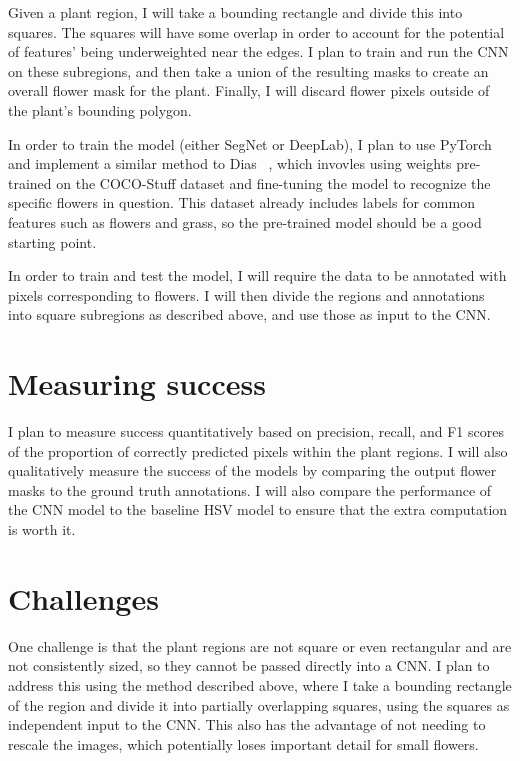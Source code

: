 \documentclass[10pt,twocolumn,letterpaper]{article}
\begin{document}
Given a plant region, I will take a bounding rectangle and divide this into squares. The squares will have some overlap in order to account for the potential of features' being underweighted near the edges. I plan to train and run the CNN on these subregions, and then take a union of the resulting masks to create an overall flower mask for the plant. Finally, I will discard flower pixels outside of the plant's bounding polygon.

In order to train the model (either SegNet or DeepLab), I plan to use PyTorch and implement a similar method to Dias \etal~\cite{Dias}, which invovles using weights pre-trained on the COCO-Stuff dataset and fine-tuning the model to recognize the specific flowers in question. This dataset already includes labels for common features such as flowers and grass, so the pre-trained model should be a good starting point.

In order to train and test the model, I will require the data to be annotated with pixels corresponding to flowers. I will then divide the regions and annotations into square subregions as described above, and use those as input to the CNN.

\section{Measuring success}

I plan to measure success quantitatively based on precision, recall, and F1 scores of the proportion of correctly predicted pixels within the plant regions. I will also qualitatively measure the success of the models by comparing the output flower masks to the ground truth annotations. I will also compare the performance of the CNN model to the baseline HSV model to ensure that the extra computation is worth it.

\section{Challenges}

One challenge is that the plant regions are not square or even rectangular and are not consistently sized, so they cannot be passed directly into a CNN. I plan to address this using the method described above, where I take a bounding rectangle of the region and divide it into partially overlapping squares, using the squares as independent input to the CNN. This also has the advantage of not needing to rescale the images, which potentially loses important detail for small flowers.
\end{document}
